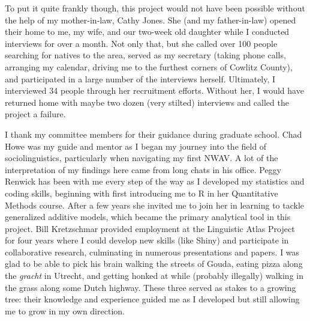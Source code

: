 To put it quite frankly though, this project would not have been possible without the help of my mother-in-law, Cathy Jones. She (and my father-in-law) opened their home to me, my wife, and our two-week old daughter while I conducted interviews for over a month. Not only that, but she called over 100 people searching for natives to the area, served as my secretary (taking phone calls, arranging my calendar, driving me to the furthest corners of Cowlitz County), and participated in a large number of the interviews herself. Ultimately, I interviewed 34 people through her recruitment efforts. Without her, I would have returned home with maybe two dozen (very stilted) interviews and called the project a failure.

I thank my committee members for their guidance during graduate school. Chad Howe was my guide and mentor as I began my journey into the field of sociolinguistics, particularly when navigating my first NWAV. A lot of the interpretation of my findings here came from long chats in his office. Peggy Renwick has been with me every step of the way as I developed my statistics and coding skills, beginning with first introducing me to R in her Quantitative Methods course. After a few years she invited me to join her in learning to tackle generalized additive models, which became the primary analytical tool in this project. Bill Kretzschmar provided employment at the Linguistic Atlas Project for four years where I could develop new skills (like Shiny) and participate in collaborative research, culminating in numerous presentations and papers. I was glad to be able to pick his brain walking the streets of Gouda, eating pizza along the \textit{gracht} in Utrecht, and getting honked at while (probably illegally) walking in the grass along some Dutch highway. These three served as stakes to a growing tree: their knowledge and experience guided me as I developed but still allowing me to grow in my own direction.


